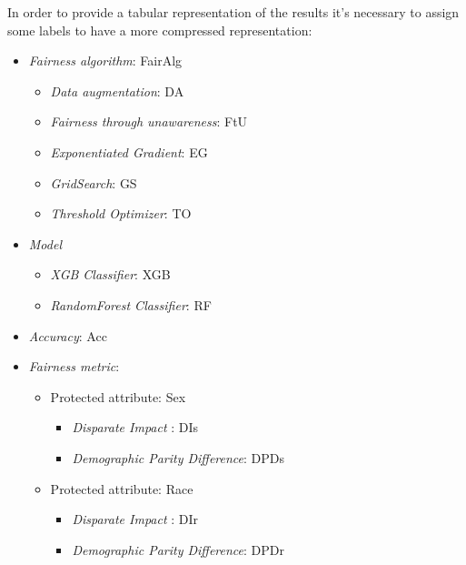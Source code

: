 In order to provide a tabular representation of the results it's necessary to assign some labels to have a more compressed representation:

\begin{itemize}
    \item \emph{Fairness algorithm}: FairAlg
    \begin{itemize}
        \item \emph{Data augmentation}: DA
        \item \emph{Fairness through unawareness}: FtU
        \item \emph{Exponentiated Gradient}: EG
        \item \emph{GridSearch}: GS
        \item \emph{Threshold Optimizer}: TO
    \end{itemize}
    \item \emph{Model}
    \begin{itemize}
        \item \emph{XGB Classifier}: XGB
        \item \emph{RandomForest Classifier}: RF
    \end{itemize}
    \item \emph{Accuracy}: Acc
    \item \emph{Fairness metric}:
    \begin{itemize}
        \item Protected attribute: Sex
        \begin{itemize}
            \item \emph{Disparate Impact }: DIs
            \item \emph{Demographic Parity Difference}: DPDs
        \end{itemize}
        \item Protected attribute: Race
        \begin{itemize}
            \item \emph{Disparate Impact }: DIr
            \item \emph{Demographic Parity Difference}: DPDr
        \end{itemize}
    \end{itemize}
\end{itemize}


